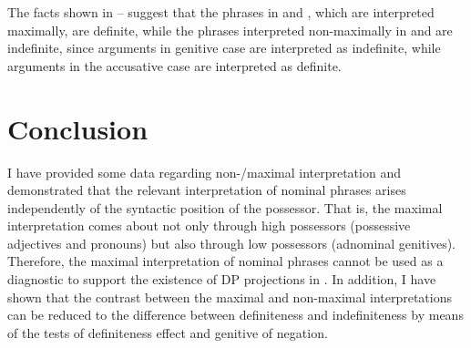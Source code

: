 \documentclass[output=paper,
colorlinks,
citecolor=brown,
newtxmath
]{langscibook}
\begin{document}
\noindent The facts shown in -- suggest that the phrases in  and , which are interpreted maximally, are definite, while the phrases interpreted non-maximally in  and  are indefinite, since arguments in genitive case are interpreted as indefinite, while arguments in the accusative case are interpreted as definite.





\section{Conclusion}\label{CON}

I have provided some data regarding non-/maximal interpretation and demonstrated that the relevant interpretation of nominal phrases arises independently of the syntactic position of the possessor. That is, the maximal interpretation comes about not only through high possessors (possessive adjectives and pronouns) but also through low possessors (adnominal genitives). Therefore, the maximal interpretation of nominal phrases cannot be used as a diagnostic to support the existence of DP projections in . In addition, I have shown that the contrast between the maximal and non-maximal interpretations can be reduced to the difference between definiteness and indefiniteness by means of the tests of definiteness effect and genitive of negation.
\end{document}
